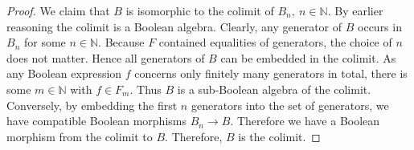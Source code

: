 \begin{proof}
    \medskip

    We claim that $B$ is isomorphic to the colimit of $B_n, ~{n\in\mathbb N}$.
    By earlier reasoning the colimit is a Boolean algebra. 
    Clearly, any generator of $B$ occurs in $B_n$ for some $n\in\mathbb N$. 
    Because $F$ contained equalities of generators,  the choice of $n$ does not matter. 
    Hence all generators of $B$ can be embedded in the colimit.
%
    As any Boolean expression $f$ concerns only finitely many generators in total, 
    there is some $m\in\mathbb N$ with $f\in F_m$.
%
    Thus $B$ is a sub-Boolean algebra of the colimit. 
    Conversely, by embedding the first $n$ generators into the set of generators, 
    we have compatible Boolean morphisms $B_n \to B$. 
    Therefore we have a Boolean morphism from the colimit to $B$. 
%
    Therefore, $B$ is the colimit. 

  \item 
\end{proof} 

